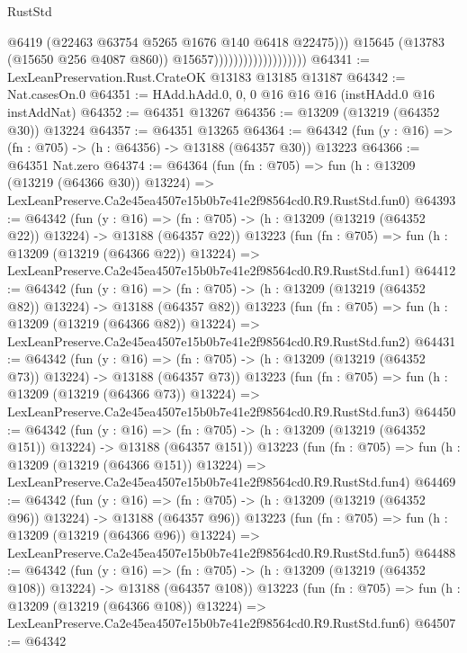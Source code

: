 \begin{lexlean}{RustStd}
\begin{coremodule}
                                              @6419
                                              (@22463 @63754 @5265 @1676 @140 @6418 @22475)))
                                          @15645
                                          (@13783 (@15650 @256 @4087 @860))
                                          @15657)))))))))))))))))))
@64341 := LexLeanPreservation.Rust.CrateOK @13183 @13185 @13187
@64342 := Nat.casesOn.{0}
@64351 := HAdd.hAdd.{0, 0, 0} @16 @16 @16 (instHAdd.{0} @16 instAddNat)
@64352 := @64351 @13267
@64356 := @13209 (@13219 (@64352 @30)) @13224
@64357 := @64351 @13265
@64364 := @64342 (fun (y : @16) => (fn : @705) -> (h : @64356) -> @13188 (@64357 @30)) @13223
@64366 := @64351 Nat.zero
@64374 := @64364
    (fun (fn : @705) =>
    fun (h : @13209 (@13219 (@64366 @30)) @13224) =>
    LexLeanPreserve.Ca2e45ea4507e15b0b7e41e2f98564cd0.R9.RustStd.fun0)
@64393 := @64342
    (fun (y : @16) =>
    (fn : @705) -> (h : @13209 (@13219 (@64352 @22)) @13224) -> @13188 (@64357 @22))
    @13223
    (fun (fn : @705) =>
    fun (h : @13209 (@13219 (@64366 @22)) @13224) =>
    LexLeanPreserve.Ca2e45ea4507e15b0b7e41e2f98564cd0.R9.RustStd.fun1)
@64412 := @64342
    (fun (y : @16) =>
    (fn : @705) -> (h : @13209 (@13219 (@64352 @82)) @13224) -> @13188 (@64357 @82))
    @13223
    (fun (fn : @705) =>
    fun (h : @13209 (@13219 (@64366 @82)) @13224) =>
    LexLeanPreserve.Ca2e45ea4507e15b0b7e41e2f98564cd0.R9.RustStd.fun2)
@64431 := @64342
    (fun (y : @16) =>
    (fn : @705) -> (h : @13209 (@13219 (@64352 @73)) @13224) -> @13188 (@64357 @73))
    @13223
    (fun (fn : @705) =>
    fun (h : @13209 (@13219 (@64366 @73)) @13224) =>
    LexLeanPreserve.Ca2e45ea4507e15b0b7e41e2f98564cd0.R9.RustStd.fun3)
@64450 := @64342
    (fun (y : @16) =>
    (fn : @705) -> (h : @13209 (@13219 (@64352 @151)) @13224) -> @13188 (@64357 @151))
    @13223
    (fun (fn : @705) =>
    fun (h : @13209 (@13219 (@64366 @151)) @13224) =>
    LexLeanPreserve.Ca2e45ea4507e15b0b7e41e2f98564cd0.R9.RustStd.fun4)
@64469 := @64342
    (fun (y : @16) =>
    (fn : @705) -> (h : @13209 (@13219 (@64352 @96)) @13224) -> @13188 (@64357 @96))
    @13223
    (fun (fn : @705) =>
    fun (h : @13209 (@13219 (@64366 @96)) @13224) =>
    LexLeanPreserve.Ca2e45ea4507e15b0b7e41e2f98564cd0.R9.RustStd.fun5)
@64488 := @64342
    (fun (y : @16) =>
    (fn : @705) -> (h : @13209 (@13219 (@64352 @108)) @13224) -> @13188 (@64357 @108))
    @13223
    (fun (fn : @705) =>
    fun (h : @13209 (@13219 (@64366 @108)) @13224) =>
    LexLeanPreserve.Ca2e45ea4507e15b0b7e41e2f98564cd0.R9.RustStd.fun6)
@64507 := @64342

\end{coremodule}
\end{lexlean}
